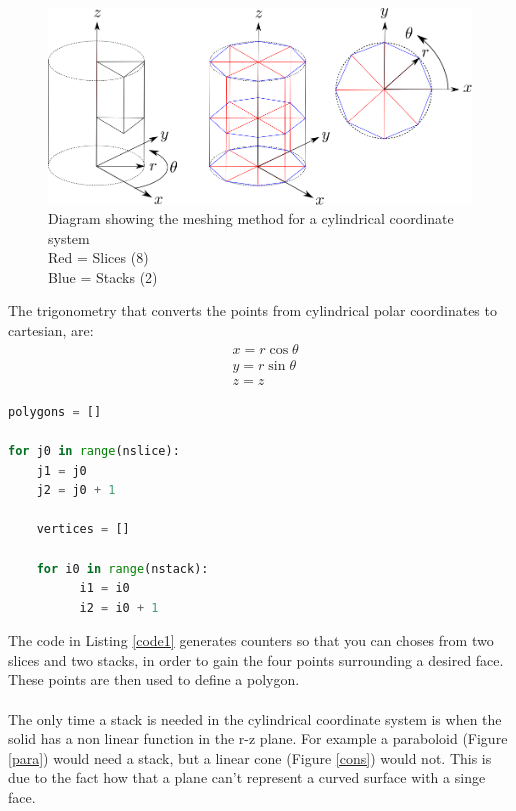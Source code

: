 \documentclass[12pt,a4paper]{article}
\begin{document}
\begin{figure}[h!]
\centering
\includegraphics[scale=0.45]{Images//Coords//cyl.png}
\caption[width=\columnwidth]{Diagram showing the meshing method for a cylindrical coordinate system\\
Red = Slices   (8)\\
Blue = Stacks (2)}
\label{cylmeshin}
\end{figure}
\vspace{0.3cm}
The trigonometry that converts the points from cylindrical polar coordinates to cartesian, are:
\begin{equation}
\begin{aligned}
\label{cyctrig}
& x = r \cos{\theta} \\
& y = r \sin{\theta} \\
& z = z
\end{aligned}
\end{equation}

\newpage
\begin{lstlisting}[language=Python, label=code1, caption=Basic method structure for pyg4ometry primitive meshing of solids]
polygons = []

for j0 in range(nslice):
    j1 = j0
    j2 = j0 + 1
    
    vertices = []

    for i0 in range(nstack):
          i1 = i0
          i2 = i0 + 1     

\end{lstlisting}
The code in Listing \ref{code1} generates counters so that you can choses from two slices and two stacks, in order to gain the four points surrounding a desired face. These points are then used to define a polygon. 
\\\\
The only time a stack is needed in the cylindrical coordinate system is when the solid has a non linear function in the r-z plane. For example a paraboloid (Figure \ref{para}) would need a stack, but a linear cone (Figure \ref{cons}) would not. This is due to the fact how that a plane can't represent a curved surface with a singe face. 
\end{document}

